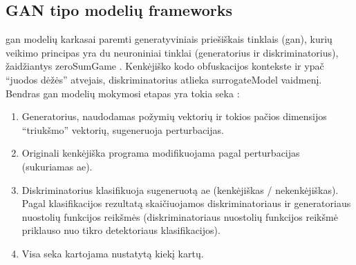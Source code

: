 \subsection{GAN tipo modelių \glspl{framework}}\label{sec:literature:gan}

\gls{gan} modelių karkasai paremti generatyviniais priešiškais tinklais (\gls{gan}), kurių veikimo principas yra du neuroniniai tinklai (generatorius ir diskriminatorius), žaidžiantys \gls{zeroSumGame} \cite{chenInfoGANInterpretableRepresentation2016a}. Kenkėjiško kodo obfuskacijos kontekste ir ypač \enquote{juodos dėžės} atvejais, diskriminatorius atlieka \gls{surrogateModel} vaidmenį. Bendras \gls{gan} modelių mokymosi etapas yra tokia seka \cite{huGeneratingAdversarialMalware2017,zhuNgramMalGANEvading2022,zhongMalFoxCamouflagedAdversarial2024}:
\begin{enumerate}
    \item Generatorius, naudodamas požymių vektorių ir tokios pačios dimensijos
          \enquote{triukšmo}  vektorių, sugeneruoja perturbacijas.
    \item Originali kenkėjiška programa modifikuojama pagal perturbacijas (sukuriamas
          \gls{ae}).
    \item Diskriminatorius klasifikuoja sugeneruotą \gls{ae} (kenkėjiškas /
          nekenkėjiškas). Pagal klasifikacijos rezultatą skaičiuojamos diskriminatoriaus
          ir generatoriaus nuostolių funkcijos reikšmės (diskriminatoriaus nuostolių
          funkcijos reikšmė priklauso nuo tikro detektoriaus klasifikacijos).
    \item Visa seka kartojama nustatytą kiekį kartų.
\end{enumerate}

